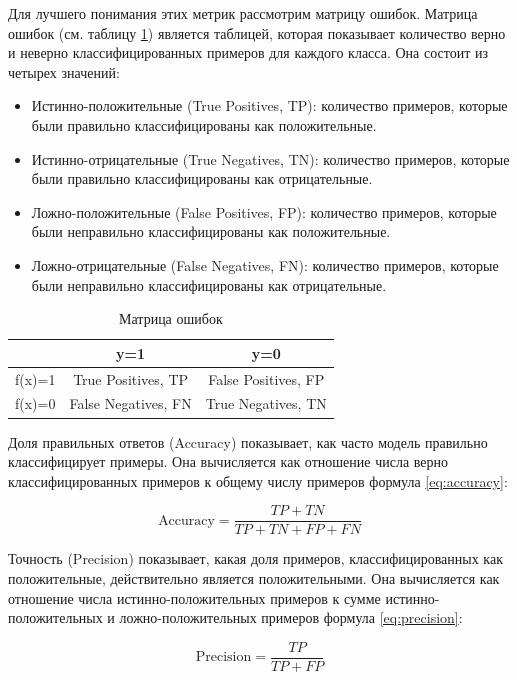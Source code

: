 \documentclass[PI, VKR]{HSEUniversity}
\begin{document}
Для лучшего понимания этих метрик рассмотрим матрицу ошибок. Матрица ошибок (см. таблицу \ref{tbl:confusion_matrix}) является таблицей, которая показывает количество верно и неверно классифицированных примеров для каждого класса. Она состоит из четырех значений:
\begin{itemize}
\item Истинно-положительные (True Positives, TP): количество примеров, которые были правильно классифицированы как положительные.
\item Истинно-отрицательные (True Negatives, TN): количество примеров, которые были правильно классифицированы как отрицательные.
\item Ложно-положительные (False Positives, FP): количество примеров, которые были неправильно классифицированы как положительные.
\item Ложно-отрицательные (False Negatives, FN): количество примеров, которые были неправильно классифицированы как отрицательные.
\end{itemize}

\begin{table}[h!]
\caption{\label{tbl:confusion_matrix}Матрица ошибок}
\centering
\begin{tabular}{|c|c|c|}
\hline
 & y=1 & y=0\\[0pt]
\hline
f(x)=1 & True Positives, TP & False Positives, FP\\[0pt]
\hline
f(x)=0 & False Negatives, FN & True Negatives, TN\\[0pt]
\hline
\end{tabular}
\end{table}

Доля правильных ответов (Accuracy) показывает, как часто модель правильно классифицирует примеры. Она вычисляется как отношение числа верно классифицированных примеров к общему числу примеров формула \ref{eq:accuracy}:

\begin{equation}
\label{eq:accuracy}
\text{{Accuracy}} = \frac{{TP + TN}}{{TP + TN + FP + FN}}
\end{equation}

Точность (Precision) показывает, какая доля примеров, классифицированных как положительные, действительно является положительными. Она вычисляется как отношение числа истинно-положительных примеров к сумме истинно-положительных и ложно-положительных примеров формула \ref{eq:precision}:

\begin{equation}
\label{eq:precision}
\text{{Precision}} = \frac{{TP}}{{TP + FP}}
\end{equation}
\end{document}
